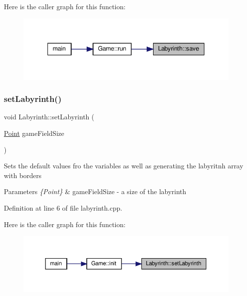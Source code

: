 Here is the caller graph for this function\+:
\nopagebreak
\begin{figure}[H]
\begin{center}
\leavevmode
\includegraphics[width=335pt]{class_labyrinth_a99e6b33f94d6d64f9c5a4fa78f08c007_icgraph}
\end{center}
\end{figure}
\mbox{\label{class_labyrinth_a39e1b11a06d126328131d387fbf51d73}} 
\subsubsection{\texorpdfstring{setLabyrinth()}{setLabyrinth()}}
{\footnotesize\ttfamily void Labyrinth\+::set\+Labyrinth (\begin{DoxyParamCaption}\item[{\mbox{\hyperlink{common_8h_aa9cfdb80b4ca12013a2de8a3b9b97981}{Point}}}]{game\+Field\+Size }\end{DoxyParamCaption})}

Sets the default values fro the variables as well as generating the labyritnh array with borders 
\begin{DoxyParams}{Parameters}
{\em \{\+Point\}} & game\+Field\+Size -\/ a size of the labyrinth \\
\hline
\end{DoxyParams}


Definition at line 6 of file labyrinth.\+cpp.

Here is the caller graph for this function\+:
\nopagebreak
\begin{figure}[H]
\begin{center}
\leavevmode
\includegraphics[width=350pt]{class_labyrinth_a39e1b11a06d126328131d387fbf51d73_icgraph}
\end{center}
\end{figure}
\mbox{\label{class_labyrinth_a43994d3b84ed457b1c04595466a61fc6}} 
